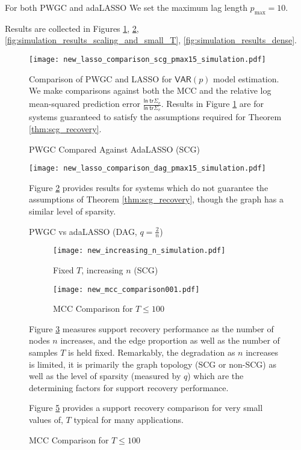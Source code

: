 \documentclass{statsoc}
\def\VAR{\mathsf{VAR}}  %
\def\ln{\mathsf{ln\ }}  %
\def\tr{\mathsf{tr }}  %
\begin{document}
For both PWGC and adaLASSO We set the maximum lag length
$p_{\text{max}} = 10$.

Results are collected in Figures
\ref{fig:simulation_results_comparison1},
\ref{fig:simulation_results_comparison2},
\ref{fig:simulation_results_scaling_and_small_T},
\ref{fig:simulation_results_dense}.

\begin{figure}
  \centering
  \caption{PWGC Compared Against AdaLASSO \cite{adaptive_lasso_zou2006} (SCG)}
  \label{fig:simulation_results_comparison1}
  \texttt{[image: new\_lasso\_comparison\_scg\_pmax15\_simulation.pdf]}

  {\footnotesize Comparison of PWGC and LASSO for $\VAR(p)$ model
    estimation.  We make comparisons against both the MCC and the
    relative log mean-squared prediction error
    $\frac{\ln\tr \widehat{\Sigma}_v}{\ln\tr \Sigma_v}$.  Results
    in Figure \ref{fig:simulation_results_comparison1} are for systems
    guaranteed to satisfy the assumptions required for Theorem
    \ref{thm:scg_recovery}.}
\end{figure}

\begin{figure}
  \caption{PWGC vs adaLASSO (DAG, $q = \frac{2}{n}$)}
  \label{fig:simulation_results_comparison2}
  \texttt{[image: new\_lasso\_comparison\_dag\_pmax15\_simulation.pdf]}

  {\footnotesize Figure \ref{fig:simulation_results_comparison2}
    provides results for systems which do not guarantee the
    assumptions of Theorem \ref{thm:scg_recovery}, though the graph
    has a similar level of sparsity.}
\end{figure}

\begin{figure}
  \centering
  \caption{PWGC Scaling and Small Sample Performance}
  \label{fig:simulation_results_scaling_and_small_T}
  \begin{subfigure}[b]{0.45\textwidth}
    \caption{Fixed $T$, increasing $n$ (SCG)}
    \label{fig:simulation_results_scaling}
    \texttt{[image: new\_increasing\_n\_simulation.pdf]}
  \end{subfigure}
  \begin{subfigure}[b]{0.45\textwidth}
    \caption{MCC Comparison for $T \le 100$}
    \label{fig:small_T_comparison}
    \texttt{[image: new\_mcc\_comparison001.pdf]}
  \end{subfigure}

  {\footnotesize Figure \ref{fig:simulation_results_scaling} measures
    support recovery performance as the number of nodes $n$ increases,
    and the edge proportion as well as the number of samples $T$ is
    held fixed.  Remarkably, the degradation as $n$ increases is
    limited, it is primarily the graph topology (SCG or non-SCG) as
    well as the level of sparsity (measured by $q$) which are the
    determining factors for support recovery performance.

    Figure \ref{fig:small_T_comparison} provides a support recovery
    comparison for very small values of, $T$ typical for many
    applications.}
\end{figure}
\end{document}
